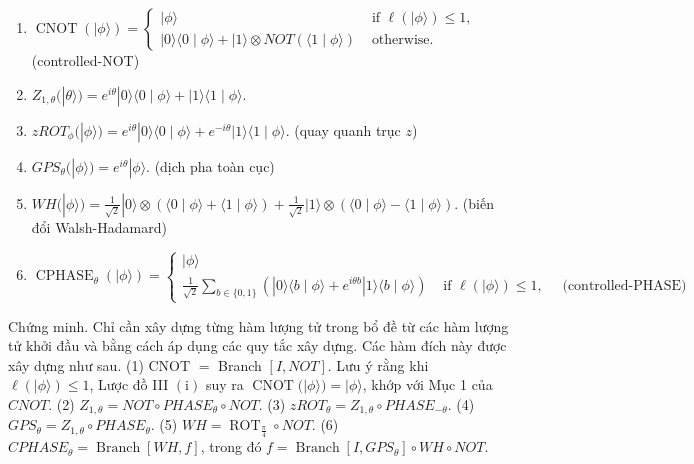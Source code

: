 \documentclass[10pt]{article}
\begin{document}
\begin{enumerate}
  \item $\operatorname{CNOT}(|\phi\rangle)=\left\{\begin{array}{ll}|\phi\rangle & \text { if } \ell(|\phi\rangle) \leq 1, \\ |0\rangle\langle 0 \mid \phi\rangle+|1\rangle \otimes N O T(\langle 1 \mid \phi\rangle) & \text { otherwise. }\end{array} \quad\right.$ (controlled-NOT)
  \item $Z_{1, \theta}(|\theta\rangle)=e^{i \theta}|0\rangle\langle 0 \mid \phi\rangle+|1\rangle\langle 1 \mid \phi\rangle$.
  \item $z R O T_{\phi}(|\phi\rangle)=e^{i \theta}|0\rangle\langle 0 \mid \phi\rangle+e^{-i \theta}|1\rangle\langle 1 \mid \phi\rangle$. (quay quanh trục $z$)
  \item $G P S_{\theta}(|\phi\rangle)=e^{i \theta}|\phi\rangle$. (dịch pha toàn cục)
  \item $W H(|\phi\rangle)=\frac{1}{\sqrt{2}}|0\rangle \otimes(\langle 0 \mid \phi\rangle+\langle 1 \mid \phi\rangle)+\frac{1}{\sqrt{2}}|1\rangle \otimes(\langle 0 \mid \phi\rangle-\langle 1 \mid \phi\rangle)$. (biến đổi Walsh-Hadamard)
  \item $\operatorname{CPHASE}_{\theta}(|\phi\rangle)= \begin{cases}|\phi\rangle \\ \frac{1}{\sqrt{2}} \sum_{b \in\{0,1\}}\left(|0\rangle\langle b \mid \phi\rangle+e^{i \theta b}|1\rangle\langle b \mid \phi\rangle\right) & \text { if } \ell(|\phi\rangle) \leq 1, \quad \text { (controlled-PHASE) }\end{cases}$
\end{enumerate}

Chứng minh. Chỉ cần xây dựng từng hàm lượng tử trong bổ đề từ các hàm lượng tử khởi đầu và bằng cách áp dụng các quy tắc xây dựng. Các hàm đích này được xây dựng như sau. (1) CNOT $=$ Branch $[I, N O T]$. Lưu ý rằng khi $\ell(|\phi\rangle) \leq 1$, Lược đồ III $(\mathrm{i})$ suy ra $\operatorname{CNOT}(|\phi\rangle)=|\phi\rangle$, khớp với Mục 1 của $C N O T$. (2) $Z_{1, \theta}=N O T \circ P H A S E_{\theta} \circ N O T$. (3) $z R O T_{\theta}=Z_{1, \theta} \circ P H A S E_{-\theta}$. (4) $G P S_{\theta}= Z_{1, \theta} \circ P H A S E_{\theta}$. (5) $W H=\operatorname{ROT}_{\frac{\pi}{4}} \circ N O T$. (6) $C P H A S E_{\theta}=\operatorname{Branch}[W H, f]$, trong đó $f=\operatorname{Branch}\left[I, G P S_{\theta}\right] \circ W H \circ N O T$.
\end{document}
